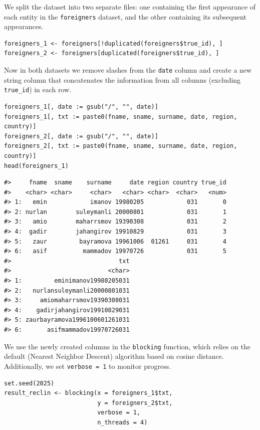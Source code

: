 We split the dataset into two separate files: one containing the first appearance of each entity in the \texttt{foreigners} dataset, and the other containing its subsequent appearances.

\begin{verbatim}
foreigners_1 <- foreigners[!duplicated(foreigners$true_id), ]
foreigners_2 <- foreigners[duplicated(foreigners$true_id), ]
\end{verbatim}

Now in both datasets we remove slashes from the \texttt{date} column and create a new string column that concatenates the information from all columns (excluding \texttt{true\_id}) in each row.

\begin{verbatim}
foreigners_1[, date := gsub("/", "", date)]
foreigners_1[, txt := paste0(fname, sname, surname, date, region, country)]
foreigners_2[, date := gsub("/", "", date)]
foreigners_2[, txt := paste0(fname, sname, surname, date, region, country)]
head(foreigners_1)
\end{verbatim}

\begin{verbatim}
#>     fname  sname    surname     date region country true_id
#>    <char> <char>     <char>   <char> <char>  <char>   <num>
#> 1:   emin            imanov 19980205            031       0
#> 2: nurlan        suleymanli 20000801            031       1
#> 3:   amio        maharrsmov 19390308            031       2
#> 4:  gadir        jahangirov 19910829            031       3
#> 5:   zaur         bayramova 19961006  01261     031       4
#> 6:   asif          mammadov 19970726            031       5
#>                              txt
#>                           <char>
#> 1:         eminimanov19980205031
#> 2:   nurlansuleymanli20000801031
#> 3:     amiomaharrsmov19390308031
#> 4:    gadirjahangirov19910829031
#> 5: zaurbayramova1996100601261031
#> 6:       asifmammadov19970726031
\end{verbatim}

We use the newly created columns in the \texttt{blocking} function, which relies on the default  (Nearest Neighbor Descent) algorithm based on cosine distance. Additionally, we set \texttt{verbose\ =\ 1} to monitor progress.

\begin{verbatim}
set.seed(2025)
result_reclin <- blocking(x = foreigners_1$txt, 
                          y = foreigners_2$txt, 
                          verbose = 1, 
                          n_threads = 4)
\end{verbatim}

